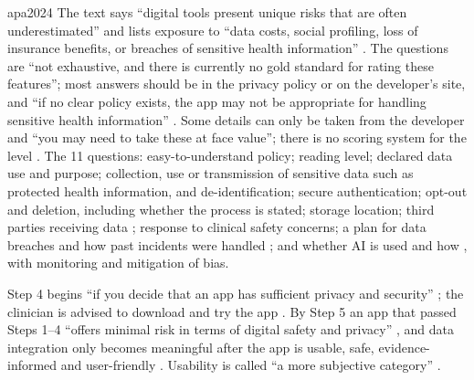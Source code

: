 \begin{papercard}{apa2024}
 The text says ``digital tools present unique risks that are often underestimated'' and lists exposure to ``data costs, social profiling, loss of insurance benefits, or breaches of sensitive health information'' . The questions are ``not exhaustive, and there is currently no gold standard for rating these features''; most answers should be in the privacy policy or on the developer's site, and ``if no clear policy exists, the app may not be appropriate for handling sensitive health information'' . Some details can only be taken from the developer and ``you may need to take these at face value''; there is no scoring system for the level . The 11 questions: easy-to-understand policy; reading level; declared data use and purpose; collection, use or transmission of sensitive data such as protected health information, and de-identification; secure authentication; opt-out and deletion, including whether the process is stated; storage location; third parties receiving data ; response to clinical safety concerns; a plan for data breaches and how past incidents were handled ; and whether AI is used and how , with monitoring and mitigation of bias.

 Step 4 begins ``if you decide that an app has sufficient privacy and security'' ; the clinician is advised to download and try the app . By Step 5 an app that passed Steps 1--4 ``offers minimal risk in terms of digital safety and privacy'' , and data integration only becomes meaningful after the app is usable, safe, evidence-informed and user-friendly . Usability is called ``a more subjective category'' .


\end{papercard}
